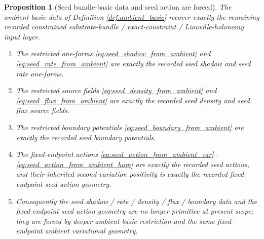 \documentclass[11pt]{article}
\newtheorem{proposition}{Proposition}
\begin{document}
\begin{proposition}[Seed bundle-basic data and seed action are forced]
\label{prop:seed_basic_forced}
The ambient-basic data of Definition \ref{def:ambient_basic} recover exactly the remaining recorded constrained substrate-bundle / exact-constraint / Liouville-holonomy input layer.
\begin{enumerate}
    \item The restricted one-forms \eqref{eq:seed_shadow_from_ambient} and \eqref{eq:seed_rate_from_ambient} are exactly the recorded seed shadow and seed rate one-forms.
    \item The restricted source fields \eqref{eq:seed_density_from_ambient} and \eqref{eq:seed_flux_from_ambient} are exactly the recorded seed density and seed flux source fields.
    \item The restricted boundary potentials \eqref{eq:seed_boundary_from_ambient} are exactly the recorded seed boundary potentials.
    \item The fixed-endpoint actions \eqref{eq:seed_action_from_ambient_car}--\eqref{eq:seed_action_from_ambient_hom} are exactly the recorded seed actions, and their inherited second-variation positivity is exactly the recorded fixed-endpoint seed action geometry.
    \item Consequently the seed shadow / rate / density / flux / boundary data and the fixed-endpoint seed action geometry are no longer primitive at present scope; they are forced by deeper ambient-basic restriction and the same fixed-endpoint ambient variational geometry.
\end{enumerate}
\end{proposition}
\end{document}
